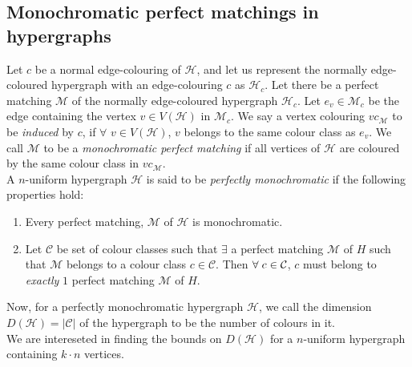 \documentclass[11pt]{article}
\begin{document}
\subsection*{Monochromatic perfect matchings in hypergraphs}
Let $c$ be a normal edge-colouring of $\mathcal{H}$, and let us represent the normally edge-coloured hypergraph with an edge-colouring $c$ as $\mathcal{H}_c$. Let there be a perfect matching $\mathcal{M}$ of the normally edge-coloured hypergraph $\mathcal{H}_c$. Let $e_v \in \mathcal{M}_c$ be the edge containing the vertex $v \in V(\mathcal{H})$ in $\mathcal{M}_c$. We say a vertex colouring $vc_\mathcal{M}$ to be \textit{induced} by $c$, if $\forall$ $v \in V(\mathcal{H})$, $v$ belongs to the same colour class as $e_v$. We call $\mathcal{M}$ to be a \textit{monochromatic perfect matching} if all vertices of $\mathcal{H}$ are coloured by the same colour class in $vc_\mathcal{M}$.\\
A $n$-uniform hypergraph $\mathcal{H}$ is said to be \textit{perfectly monochromatic} if the following properties hold:
\begin{enumerate}
    \item Every perfect matching, $\mathcal{M}$ of $\mathcal{H}$ is monochromatic.
    \item Let $\mathcal{C}$ be set of colour classes such that $\exists$ a perfect matching $\mathcal{M}$ of $H$ such that $\mathcal{M}$ belongs to a colour class $c \in \mathcal{C}$. Then $\forall \hspace{0.1cm} c \in \mathcal{C}$, $c$ must belong to \textit{exactly} $1$ perfect matching $\mathcal{M}$ of $H$.
\end{enumerate}
Now, for a perfectly monochromatic hypergraph $\mathcal{H}$, we call the dimension $D(\mathcal{H})=|\mathcal{C}|$ of the hypergraph to be the number of colours in it.\\
We are intereseted in finding the bounds on $D(\mathcal{H})$ for a $n$-uniform hypergraph containing $k\cdot n$ vertices.
\end{document}
